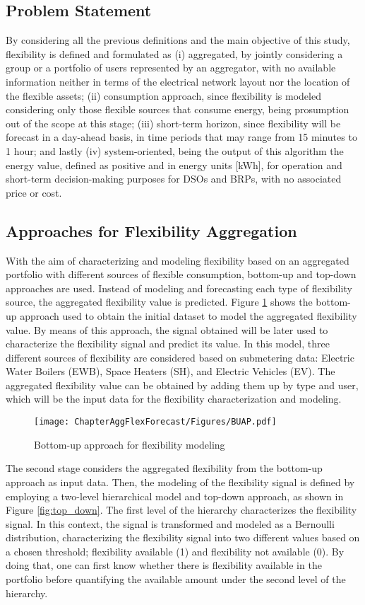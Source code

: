 \subsection{Problem Statement}
By considering all the previous definitions and the main objective of this study, flexibility is defined and formulated as (i) aggregated, by jointly considering a group or a portfolio of users represented by an aggregator, with no available information neither in terms of the electrical network layout nor the location of the flexible assets; (ii) consumption approach, since flexibility is modeled considering only those flexible sources that consume energy, being prosumption out of the scope at this stage; (iii) short-term horizon, since flexibility will be forecast in a day-ahead basis, in time periods that may range from 15 minutes to 1 hour; and lastly (iv) system-oriented, being the output of this algorithm the energy value, defined as positive and in energy units [kWh], for operation and short-term decision-making purposes for DSOs and BRPs, with no associated price or cost. 

\subsection{Approaches for Flexibility Aggregation}
With the aim of characterizing and modeling flexibility based on an aggregated portfolio with different sources of flexible consumption, bottom-up and top-down approaches are used. Instead of modeling and forecasting each type of flexibility source, the aggregated flexibility value is predicted. Figure \ref{fig:bottom_up} shows the bottom-up approach used to obtain the initial dataset to model the aggregated flexibility value. By means of this approach, the signal obtained will be later used to characterize the flexibility signal and predict its value. In this model, three different sources of flexibility are considered based on submetering data: Electric Water Boilers (EWB), Space Heaters (SH), and Electric Vehicles (EV). The aggregated flexibility value can be obtained by adding them up by type and user, which will be the input data for the flexibility characterization and modeling.

\begin{figure}[]
\centerline{\texttt{[image: ChapterAggFlexForecast/Figures/BUAP.pdf]}}
\caption{Bottom-up approach for flexibility modeling}
\label{fig:bottom_up}
\end{figure}

The second stage considers the aggregated flexibility from the bottom-up approach as input data. Then, the modeling of the flexibility signal is defined by employing a two-level hierarchical model and top-down approach, as shown in Figure \ref{fig:top_down}. The first level of the hierarchy characterizes the flexibility signal. In this context, the signal is transformed and modeled as a Bernoulli distribution, characterizing the flexibility signal into two different values based on a chosen threshold; flexibility available (1) and flexibility not available (0). By doing that, one can first know whether there is flexibility available in the portfolio before quantifying the available amount under the second level of the hierarchy. 

